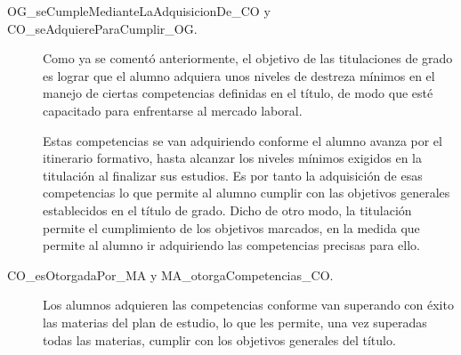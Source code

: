 	\begin{description}

    		\item [OG\_seCumpleMedianteLaAdquisicionDe\_CO y CO\_seAdquiereParaCumplir\_OG.] Como ya se comentó anteriormente, el objetivo de las titulaciones de grado es lograr que el alumno adquiera unos niveles de destreza mínimos en el manejo de ciertas competencias definidas en el título, de modo que esté capacitado para enfrentarse al mercado laboral.
    
	    Estas competencias se van adquiriendo conforme el alumno avanza por el itinerario formativo, hasta alcanzar los niveles mínimos exigidos en la titulación al finalizar sus estudios. Es por tanto la adquisición de esas competencias lo que permite al alumno cumplir con las objetivos generales establecidos en el título de grado. Dicho de otro modo, la titulación permite el cumplimiento de los objetivos marcados, en la medida que permite al alumno ir adquiriendo las competencias precisas para ello.
			
			
    
	    \item [CO\_esOtorgadaPor\_MA y MA\_otorgaCompetencias\_CO.] Los alumnos adquieren las competencias conforme van superando con éxito las materias del plan de estudio, lo que les permite, una vez superadas todas las materias, cumplir con los objetivos generales del título.
    			
			
    

\end{description}
